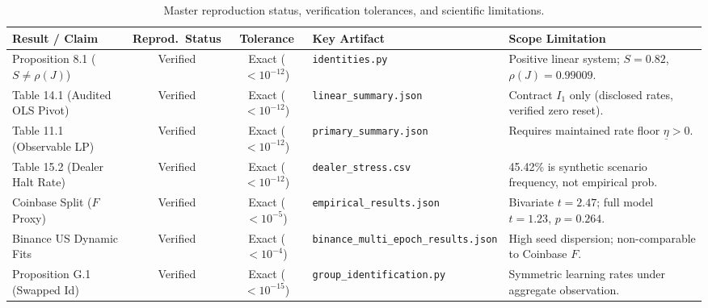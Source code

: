 \begin{table}[htbp]
\centering\small
\caption{Master reproduction status, verification tolerances, and scientific limitations.}
\label{tab:T9_reproduction_status}
\begin{tabularx}{\textwidth}{p{}ccp{}Y}
\toprule
Result / Claim & Reprod.\ Status & Tolerance & Key Artifact & Scope Limitation \\
\midrule
Proposition 8.1 ($S \ne \rho(J)$) & Verified & Exact ($< 10^{-12}$) & \texttt{identities.py} & Positive linear system; $S=0.82$, $\rho(J)=0.99009$. \\
Table 14.1 (Audited OLS Pivot) & Verified & Exact ($< 10^{-12}$) & \texttt{linear\_summary.json} & Contract $I_1$ only (disclosed rates, verified zero reset). \\
Table 11.1 (Observable LP) & Verified & Exact ($< 10^{-12}$) & \texttt{primary\_summary.json} & Requires maintained rate floor $\underline\eta > 0$. \\
Table 15.2 (Dealer Halt Rate) & Verified & Exact ($< 10^{-12}$) & \texttt{dealer\_stress.csv} & 45.42\% is synthetic scenario frequency, not empirical prob. \\
Coinbase Split ($F$ Proxy) & Verified & Exact ($< 10^{-5}$) & \texttt{empirical\_results.json} & Bivariate $t=2.47$; full model $t=1.23$, $p=0.264$. \\
Binance US Dynamic Fits & Verified & Exact ($< 10^{-4}$) & \texttt{binance\_multi\_epoch\_results.json} & High seed dispersion; non-comparable to Coinbase $F$. \\
Proposition G.1 (Swapped Id) & Verified & Exact ($< 10^{-15}$) & \texttt{group\_identification.py} & Symmetric learning rates under aggregate observation. \\
\bottomrule
\end{tabularx}
\end{table}
